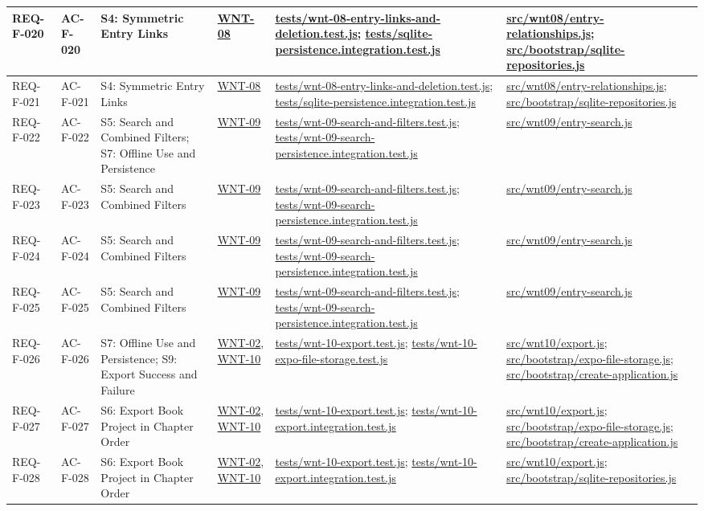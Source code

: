 \documentclass[10pt,a4paper]{article}
\renewcommand{\texttt}[1]{\url{#1}}
\begin{document}
\begin{longtable}{|L{2.5cm}|L{2.6cm}|L{4.4cm}|L{3.3cm}|L{3.3cm}|L{3.3cm}|L{3.3cm}|}
REQ-F-020 & AC-F-020 & S4: Symmetric Entry Links & \texttt{WNT-08} & \texttt{tests/wnt-08-entry-links-and-deletion.test.js}; \texttt{tests/sqlite-persistence.integration.test.js} & \texttt{src/wnt08/entry-relationships.js}; \texttt{src/bootstrap/sqlite-repositories.js} & \\ \hline
REQ-F-021 & AC-F-021 & S4: Symmetric Entry Links & \texttt{WNT-08} & \texttt{tests/wnt-08-entry-links-and-deletion.test.js}; \texttt{tests/sqlite-persistence.integration.test.js} & \texttt{src/wnt08/entry-relationships.js}; \texttt{src/bootstrap/sqlite-repositories.js} & \\ \hline
REQ-F-022 & AC-F-022 & S5: Search and Combined Filters; S7: Offline Use and Persistence & \texttt{WNT-09} & \texttt{tests/wnt-09-search-and-filters.test.js}; \texttt{tests/wnt-09-search-persistence.integration.test.js} & \texttt{src/wnt09/entry-search.js} & \\ \hline
REQ-F-023 & AC-F-023 & S5: Search and Combined Filters & \texttt{WNT-09} & \texttt{tests/wnt-09-search-and-filters.test.js}; \texttt{tests/wnt-09-search-persistence.integration.test.js} & \texttt{src/wnt09/entry-search.js} & \\ \hline
REQ-F-024 & AC-F-024 & S5: Search and Combined Filters & \texttt{WNT-09} & \texttt{tests/wnt-09-search-and-filters.test.js}; \texttt{tests/wnt-09-search-persistence.integration.test.js} & \texttt{src/wnt09/entry-search.js} & \\ \hline
REQ-F-025 & AC-F-025 & S5: Search and Combined Filters & \texttt{WNT-09} & \texttt{tests/wnt-09-search-and-filters.test.js}; \texttt{tests/wnt-09-search-persistence.integration.test.js} & \texttt{src/wnt09/entry-search.js} & \\ \hline
REQ-F-026 & AC-F-026 & S7: Offline Use and Persistence; S9: Export Success and Failure & \texttt{WNT-02}, \texttt{WNT-10} & \texttt{tests/wnt-10-export.test.js}; \texttt{tests/wnt-10-expo-file-storage.test.js} & \texttt{src/wnt10/export.js}; \texttt{src/bootstrap/expo-file-storage.js}; \texttt{src/bootstrap/create-application.js} & \\ \hline
REQ-F-027 & AC-F-027 & S6: Export Book Project in Chapter Order & \texttt{WNT-02}, \texttt{WNT-10} & \texttt{tests/wnt-10-export.test.js}; \texttt{tests/wnt-10-export.integration.test.js} & \texttt{src/wnt10/export.js}; \texttt{src/bootstrap/expo-file-storage.js}; \texttt{src/bootstrap/create-application.js} & \\ \hline
REQ-F-028 & AC-F-028 & S6: Export Book Project in Chapter Order & \texttt{WNT-02}, \texttt{WNT-10} & \texttt{tests/wnt-10-export.test.js}; \texttt{tests/wnt-10-export.integration.test.js} & \texttt{src/wnt10/export.js}; \texttt{src/bootstrap/sqlite-repositories.js} & \\ \hline

\end{longtable}
\end{document}
